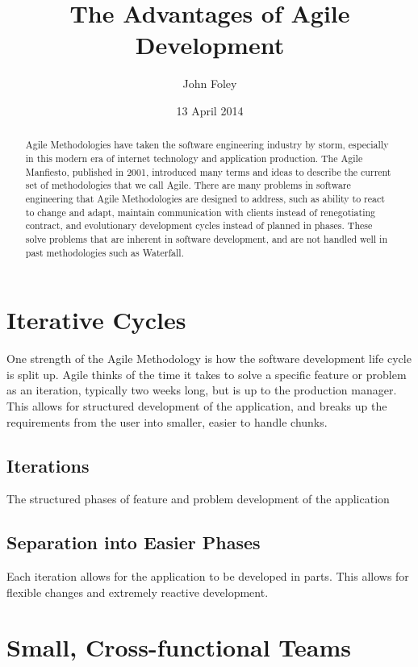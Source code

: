 \documentclass[11pt]{article}
\title{The Advantages of Agile Development}
\author{John Foley}
\date{13 April 2014}
\begin{document}
\maketitle

\thispagestyle{empty}

\begin{abstract}
  Agile Methodologies have taken the software engineering industry by storm, especially in this modern
  era of internet technology and application production. The Agile Manfiesto, published in 2001,
 introduced many terms and ideas to describe the current set of methodologies that we call Agile. There are many
 problems in software engineering that Agile Methodologies are designed to address, such as ability to react to 
 change and adapt, maintain communication with clients instead of renegotiating contract, and evolutionary development cycles
 instead of planned in phases. These solve problems that are inherent in software development, and are not handled well in past
 methodologies such as Waterfall. 
\end{abstract}

\section{Iterative Cycles}

One strength of the Agile Methodology is how the software development life cycle is split up. Agile thinks
of the time it takes to solve a specific feature or problem as an iteration, typically two weeks long, but
is up to the production manager. This allows for structured development of the application, and breaks
up the requirements from the user into smaller, easier to handle chunks. 

\subsection{Iterations} 
The structured phases of feature and problem development of the application

\subsection{Separation into Easier Phases} 
Each iteration allows for the application to be developed in parts. This allows for flexible changes and
extremely reactive development.~\cite{Cao:2010:MDA:1877725.1877730}

\section{Small, Cross-functional Teams}
\end{document}
